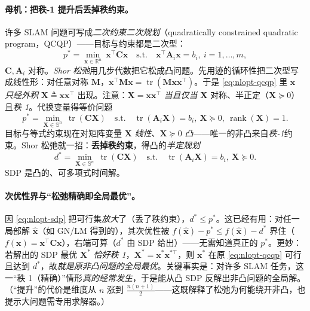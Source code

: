 \paragraph{母机：把秩-1 提升后丢掉秩约束。}\cite{rosen2019sesync,carlone2026handbook}
许多 SLAM 问题可写成\emph{二次约束二次规划}（quadratically constrained quadratic program，QCQP）——目标与约束都是二次型：
\begin{equation}
  p^*=\min_{\mathbf{x}\in\mathbb{R}^n}\ \mathbf{x}^\top\mathbf{C}\mathbf{x}
  \quad\text{s.t.}\quad \mathbf{x}^\top\mathbf{A}_i\mathbf{x}=b_i,\ i=1,\dots,m,
  \label{eq:nlopt-qcqp}
\end{equation}
$\mathbf{C},\mathbf{A}_i$ 对称。\emph{Shor 松弛}用几步代数把它松成凸问题。先用迹的循环性把二次型写成线性形：对任意对称 $\mathbf{M}$，$\mathbf{x}^\top\mathbf{M}\mathbf{x}=\operatorname{tr}(\mathbf{M}\mathbf{x}\mathbf{x}^\top)$。于是 \cref{eq:nlopt-qcqp} 里 $\mathbf{x}$ \emph{只经外积} $\mathbf{X}\triangleq\mathbf{x}\mathbf{x}^\top$ 出现。注意：$\mathbf{X}=\mathbf{x}\mathbf{x}^\top$ \emph{当且仅当} $\mathbf{X}$ 对称、半正定（$\mathbf{X}\succeq0$）且\emph{秩 1}。代换变量得等价问题
\begin{equation}
  p^*=\min_{\mathbf{X}\in\mathbb{S}^n}\ \operatorname{tr}(\mathbf{C}\mathbf{X})
  \quad\text{s.t.}\quad \operatorname{tr}(\mathbf{A}_i\mathbf{X})=b_i,\ \mathbf{X}\succeq0,\ \operatorname{rank}(\mathbf{X})=1.
  \label{eq:nlopt-qcqp-lifted}
\end{equation}
目标与等式约束现在对矩阵变量 $\mathbf{X}$ \emph{线性}、$\mathbf{X}\succeq0$ \emph{凸}——唯一的非凸来自\emph{秩-1}约束。Shor 松弛就一招：\textbf{丢掉秩约束}，得凸的\emph{半定规划}
\begin{equation}
  d^*=\min_{\mathbf{X}\in\mathbb{S}^n}\ \operatorname{tr}(\mathbf{C}\mathbf{X})
  \quad\text{s.t.}\quad \operatorname{tr}(\mathbf{A}_i\mathbf{X})=b_i,\ \mathbf{X}\succeq0.
  \label{eq:nlopt-sdp}
\end{equation}
SDP 是凸的、可多项式时间解。

\paragraph{次优性界与“松弛精确即全局最优”。}\cite{rosen2019sesync}
因 \cref{eq:nlopt-sdp} 把可行集\emph{放大}了（丢了秩约束），$d^*\le p^*$。这已经有用：对任一局部解 $\hat{\mathbf{x}}$（如 GN/LM 得到的），其次优性被 $f(\hat{\mathbf{x}})-p^*\le f(\hat{\mathbf{x}})-d^*$ 界住（$f(\mathbf{x})=\mathbf{x}^\top\mathbf{C}\mathbf{x}$），右端可算（$d^*$ 由 SDP 给出）——无需知道真正的 $p^*$。更妙：若解出的 SDP 最优 $\mathbf{X}^*$ \emph{恰好秩 1}，$\mathbf{X}^*=\mathbf{x}^*\mathbf{x}^{*\top}$，则 $\mathbf{x}^*$ 在原 \cref{eq:nlopt-qcqp} 可行且达到 $d^*$，故\emph{就是原非凸问题的全局最优}。关键事实是：对许多 SLAM 任务，这一“秩 1（精确）”情形\emph{真的经常发生}，于是能从凸 SDP 反解出非凸问题的全局解。（“提升”的代价是维度从 $n$ 涨到 $\tfrac{n(n+1)}{2}$——这既解释了松弛为何能绕开非凸，也提示大问题需专用求解器。）

